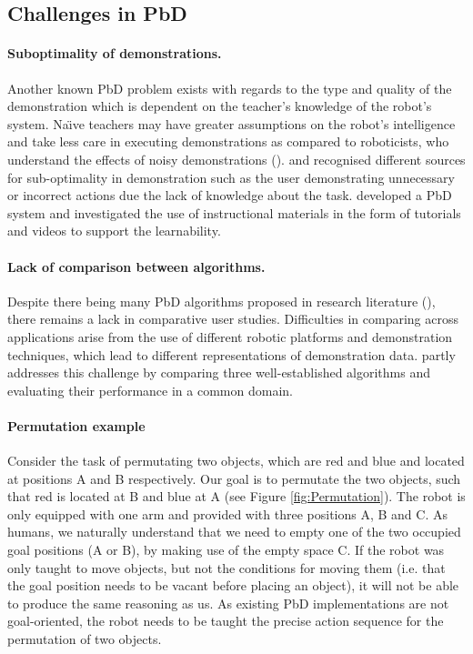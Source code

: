 \subsection{Challenges in PbD}\label{sssec:Challenges in PbD}

\paragraph{Suboptimality of demonstrations.}
Another known PbD problem exists with regards to the type and quality of the demonstration which is dependent on the teacher's knowledge of the robot's system.
Na\"{\i}ve teachers may have greater assumptions on the robot's intelligence and take less care in executing demonstrations as compared to roboticists, who understand the effects of noisy demonstrations (\cite{suay2012practical}).
\cite{chen2003programing} and \cite{kaiser1995obtaining} recognised different sources for sub-optimality in demonstration such as the user demonstrating unnecessary or incorrect actions due the lack of knowledge about the task.
\cite{cakmak2014teaching} developed a PbD system and investigated the use of instructional materials in the form of tutorials and videos to support the learnability.

\paragraph{Lack of comparison between algorithms.}
Despite there being many PbD algorithms proposed in research literature (\cite{argall2009survey,billing2010formalism}), there remains a lack in comparative user studies.
Difficulties in comparing across applications arise from the use of different robotic platforms and demonstration techniques, which lead to different representations of demonstration data.
\cite{suay2012practical} partly addresses this challenge by comparing three well-established algorithms and evaluating their performance in a common domain.


\paragraph{Permutation example}
Consider the task of permutating two objects, which are red and blue and located at positions A and B respectively.
Our goal is to permutate the two objects, such that red is located at B and blue at A (see Figure \ref{fig:Permutation}).
The robot is only equipped with one arm and provided with three positions A, B and C.
As humans, we naturally understand that we need to empty one of the two occupied goal positions (A or B), by making use of the empty space C.
If the robot was only taught to move objects, but not the conditions for moving them (i.e.
 that the goal position needs to be vacant before placing an object), it will not be able to produce the same reasoning as us.
As existing PbD implementations are not goal-oriented, the robot needs to be taught the precise action sequence for the permutation of two objects.

